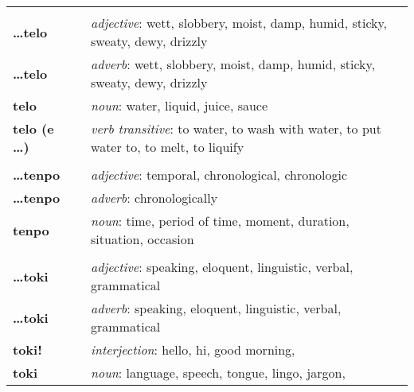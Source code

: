 \begin{supertabular}{p{2,5cm}|ll}
                                 &  &                                                                                                            \\
    \textbf{\dots telo}          &  & \textit{adjective}: wett, slobbery, moist, damp, humid, sticky, sweaty, dewy, drizzly                      \\
    \textbf{\dots telo}          &  & \textit{adverb}: wett, slobbery, moist, damp, humid, sticky, sweaty, dewy, drizzly                         \\
    \textbf{telo}                &  & \textit{noun}: water, liquid, juice, sauce                                                                 \\
    \textbf{telo (e \dots)}      &  & \textit{verb transitive}: to water, to wash with water, to put water to, to melt, to liquify               \\
                                 &  &                                                                                                            \\
    \textbf{\dots tenpo}         &  & \textit{adjective}: temporal, chronological, chronologic                                                   \\
    \textbf{\dots tenpo}         &  & \textit{adverb}: chronologically                                                                           \\
    \textbf{tenpo}               &  & \textit{noun}: time, period of time, moment, duration, situation, occasion                                 \\
                                 &  &                                                                                                            \\
    \textbf{\dots toki}          &  & \textit{adjective}: speaking, eloquent, linguistic, verbal, grammatical                                    \\
    \textbf{\dots toki}          &  & \textit{adverb}: speaking, eloquent, linguistic, verbal, grammatical                                       \\
    \textbf{toki!}               &  & \textit{interjection}: hello, hi, good morning,                                                            \\
    \textbf{toki}                &  & \textit{noun}: language, speech, tongue, lingo, jargon,                                                    \\

\end{supertabular}
